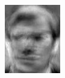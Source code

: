 \begin{frame}
\begin{columns}
\begin{overlayarea}{\textwidth}{\textheight}
{\begin{minipage}[t]{0.15\textwidth}
          \includegraphics[width=\textwidth]{images/eig_docked_image/eig_12.jpeg}
        \end{minipage}

}
\end{overlayarea}
\end{columns}
\end{frame}
